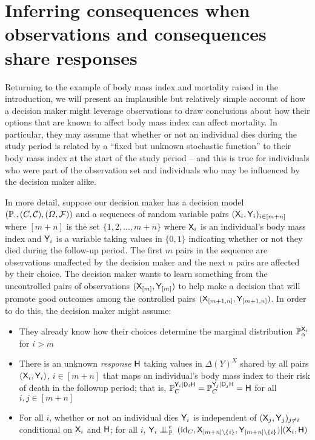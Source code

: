
\section[Shared responses]{Inferring consequences when observations and consequences share responses}\label{sec:evaluating_decisions}

Returning to the example of body mass index and mortality raised in the introduction, we will present an implausible but relatively simple account of how a decision maker might leverage observations to draw conclusions about how their options that are known to affect body mass index can affect mortality. In particular, they may assume that whether or not an individual dies during the study period is related by a ``fixed but unknown stochastic function'' to their body mass index at the start of the study period -- and this is true for individuals who were part of the observation set and individuals who may be influenced by the decision maker alike. 

In more detail, suppose our decision maker has a decision model $(\mathbb{P}_{\cdot}, (C,\mathcal{C}), (\Omega,\mathcal{F}))$ and a sequences of random variable pairs $(\mathsf{X}_i,\mathsf{Y}_i)_{i\in [m+n]}$ where $[m+n]$ is the set $\{1,2,...,m+n\}$ where $\mathsf{X}_i$ is an individual's body mass index and $\mathsf{Y}_i$ is a variable taking values in $\{0,1\}$ indicating whether or not they died during the follow-up period. The first $m$ pairs in the sequence are observations unaffected by the decision maker and the next $n$ pairs are affected by their choice. The decision maker wants to learn something from the uncontrolled pairs of observations $(\mathsf{X}_{[m]},\mathsf{Y}_{[m]})$ to help make a decision that will promote good outcomes among the controlled pairs $(\mathsf{X}_{[m+1,n]},\mathsf{Y}_{[m+1,n]})$. In order to do this, the decision maker might assume:
\begin{itemize}
    \item They already know how their choices determine the marginal distribution $\mathbb{P}_\alpha^{\mathsf{X}_i}$ for $i>m$
    \item There is an unknown \emph{response} $\mathsf{H}$ taking values in $\Delta(Y)^X$ shared by all pairs $(\mathsf{X}_i,\mathsf{Y}_i)$, $i\in [m+n]$ that maps an individual's body mass index to their risk of death in the followup period; that is, $\mathbb{P}_C^{\mathsf{Y}_i|\mathsf{D}_i\mathsf{H}}=\mathbb{P}_C^{\mathsf{Y}_j|\mathsf{D}_j\mathsf{H}}=\mathsf{H}$ for all $i,j\in [m+n]$
    \item For all $i$, whether or not an individual dies $\mathsf{Y}_i$ is independent of $(\mathsf{X}_j,\mathsf{Y}_j)_{j\neq i}$ conditional on $\mathsf{X}_i$ and $\mathsf{H}$; for all $i$, $\RV{Y}_i\CI^e_{\prob{P}_\cdot} (\mathrm{id}_C,\RV{X}_{[m+n]\setminus \{i\}},\RV{Y}_{[m+n]\setminus \{i\}})|(\RV{X}_i,\RV{H})$
\end{itemize}


